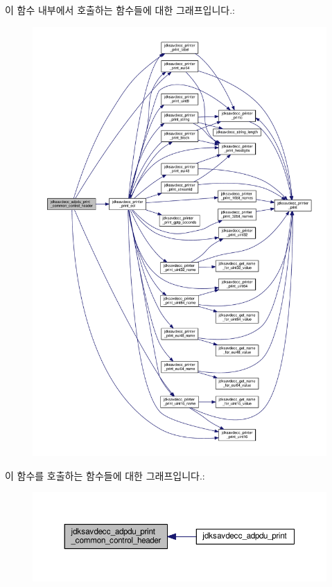 이 함수 내부에서 호출하는 함수들에 대한 그래프입니다.\+:
\nopagebreak
\begin{figure}[H]
\begin{center}
\leavevmode
\includegraphics[width=350pt]{group__adp__print_ga744463f0fee49761a57b82dcddd2a962_cgraph}
\end{center}
\end{figure}




이 함수를 호출하는 함수들에 대한 그래프입니다.\+:
\nopagebreak
\begin{figure}[H]
\begin{center}
\leavevmode
\includegraphics[width=350pt]{group__adp__print_ga744463f0fee49761a57b82dcddd2a962_icgraph}
\end{center}
\end{figure}




